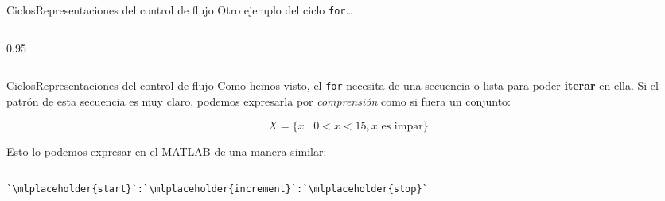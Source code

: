 \documentclass[spanish, c]{beamer}
\newcommand{\matlab}[1]{\lstinline[style=Matlab-editor]!#1!}
\begin{document}
\begin{frame}{Ciclos}{Representaciones del control de flujo}    
    Otro ejemplo del ciclo \matlab{for}\dots
    
    \bigskip
    \begin{columns}
        \begin{column}{0.95\linewidth}
            
        \end{column}
    \end{columns}
\end{frame}

\begin{frame}[fragile]{Ciclos}{Representaciones del control de flujo}
    Como hemos visto, el \matlab{for} necesita de una \alert{secuencia} o \alert{lista} para poder \textbf{iterar} en ella.
    Si el patrón de esta secuencia es muy claro, podemos expresarla por \textit{comprensión} como si fuera un conjunto:

    $$X = \{x \mid 0 < x < 15, x \text{ es impar}\}$$

    Esto lo podemos expresar en el MATLAB de una manera similar:

    \begin{columns}
        \begin{column}{0.95\linewidth}
                \begin{lstlisting}[frame=none, numbers=none]
                        `\mlplaceholder{start}`:`\mlplaceholder{increment}`:`\mlplaceholder{stop}`
                \end{lstlisting}
    \bigskip

    
        \end{column}
    \end{columns}
\end{frame}




\end{document}
